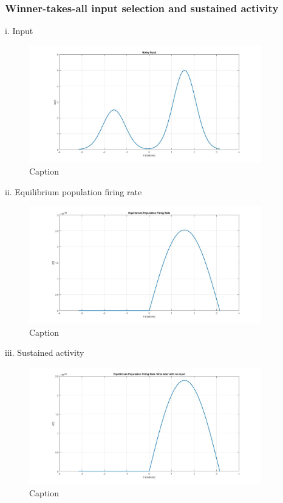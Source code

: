 \documentclass{article}
\begin{document}
\subsubsection{Winner-takes-all input selection and sustained activity}
i. Input
\begin{figure}[H] 
	\begin{center}
		\includegraphics[width=0.9\textwidth]{Section1/Part3/3c_i.jpg}
		\caption{Caption \label{Q2a_iii_g2}}
	\end{center}
\end{figure}

ii. Equilibrium population firing rate
\begin{figure}[H] 
	\begin{center}
		\includegraphics[width=0.9\textwidth]{Section1/Part3/3c_ii.jpg}
		\caption{Caption \label{Q2a_iii_g2}}
	\end{center}
\end{figure}

iii. Sustained activity
\begin{figure}[H] 
	\begin{center}
		\includegraphics[width=0.9\textwidth]{Section1/Part3/3c_iii.jpg}
		\caption{Caption \label{Q2a_iii_g2}}
	\end{center}
\end{figure}
\end{document}
